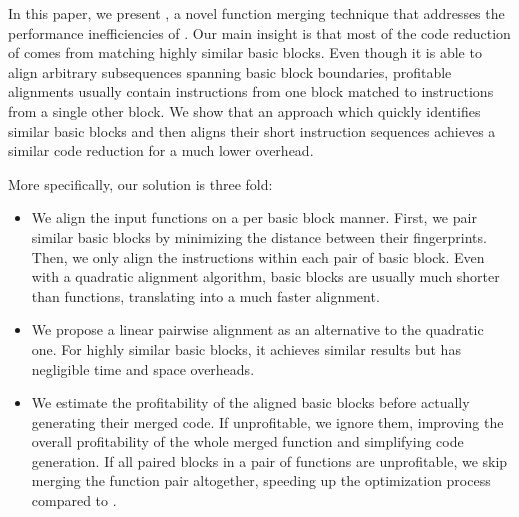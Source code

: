 
In this paper, we present \ProjName, a novel function merging technique that addresses the performance inefficiencies of \SOAName.
Our main insight is that most of the code reduction of {\SOAName} comes from matching highly similar basic blocks.
Even though it is able to align arbitrary subsequences spanning basic block boundaries, profitable alignments usually contain instructions from one block matched to instructions from a single other block.
We show that an approach which quickly identifies similar basic blocks and then aligns their short instruction sequences achieves a similar code reduction for a much lower overhead.

More specifically, our solution is three fold:
\begin{itemize} %
   \item We align the input functions on a per basic block manner.
   First, we pair similar basic blocks by minimizing the distance between their fingerprints.
   Then, we only align the instructions within each pair of basic block.  
   Even with a quadratic alignment algorithm, basic blocks are usually much shorter than functions, translating into a much faster alignment.
   \item We propose a linear pairwise alignment as an alternative to the quadratic one. For highly similar basic blocks, it achieves similar results but has negligible time and space overheads.
   \item We estimate the profitability of the aligned basic blocks before actually generating their merged code.
   If unprofitable, we ignore them, improving the overall profitability of the whole merged function and simplifying code generation.
   If all paired blocks in a pair of functions are unprofitable, we skip merging the function pair altogether, speeding up the optimization process compared to {\SOAName}. 
\end{itemize}

